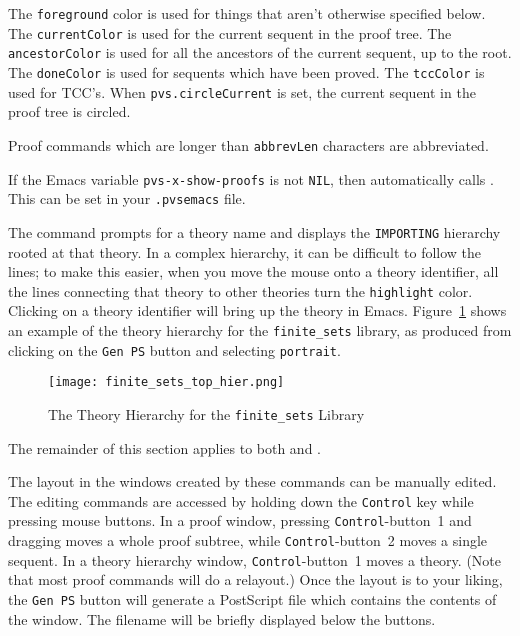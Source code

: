 The \texttt{foreground} color is used for things that aren't otherwise
specified below.  The \texttt{currentColor} is used for the current
sequent in the proof tree.  The \texttt{ancestorColor} is used for all
the ancestors of the current sequent, up to the root.  The
\texttt{doneColor} is used for sequents which have been proved.  The
\texttt{tccColor} is used for TCC's.  When \texttt{pvs.circle\-Current}
is set, the current sequent in the proof tree is circled.

Proof commands which are longer than \texttt{abbrevLen} characters are
abbreviated.

If the Emacs variable
\texttt{pvs-x-show-proofs}
is not \texttt{NIL}, then  automatically calls
.  This can be set in your
\texttt{.pvsemacs} file.

The  command prompts for a theory name and
displays the \texttt{IM\-PORTING} hierarchy rooted at that theory.  In a
complex hierarchy, it can be difficult to follow the lines; to make
this easier, when you move the mouse onto a theory identifier, all the
lines connecting that theory to other theories turn the
\texttt{highlight} color.  Clicking on a theory identifier will bring
up the theory in Emacs.  Figure~\ref{x-hierarchy} shows an example of the
theory hierarchy for the \texttt{finite\_sets} library, as produced from
clicking on the \texttt{Gen PS} button and selecting \texttt{portrait}.

\begin{figure}
\texttt{[image: finite\_sets\_top\_hier.png]}
\caption{The Theory Hierarchy for the \texttt{finite\_sets} Library}\label{x-hierarchy}
\end{figure}


The remainder of this section applies to both  and
.

The layout in the windows created by these commands can be manually
edited.  The editing commands are accessed by holding down the
\texttt{Control} key while pressing mouse buttons. In a proof window,
pressing \texttt{Control}-button~1 and dragging moves a whole proof
subtree, while \texttt{Control}-button~2 moves a single sequent.  In a
theory hierarchy window, \texttt{Control}-button~1 moves a theory.
(Note that most proof commands will do a relayout.)  Once the layout
is to your liking, the \texttt{Gen~PS} button will generate a
PostScript file which contains the contents of the window.  The
filename will be briefly displayed below the buttons.

